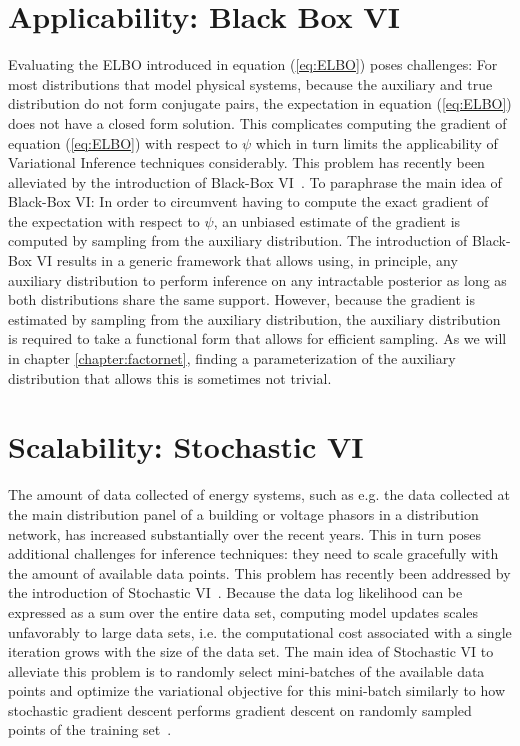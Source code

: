 \documentclass[11pt]{cmuthesis} %
\begin{document}
\section{Applicability: Black Box VI}
Evaluating the ELBO introduced in equation (\ref{eq:ELBO}) poses challenges: For most distributions that model physical systems, because the auxiliary and true distribution do not form conjugate pairs, the expectation in equation (\ref{eq:ELBO}) does not have a closed form solution. This complicates computing the gradient of equation (\ref{eq:ELBO}) with respect to $\psi$ which in turn limits the applicability of Variational Inference techniques considerably. This problem has recently been alleviated by the introduction of Black-Box VI~\cite{ranganath2014black}. To paraphrase the main idea of Black-Box VI: In order to circumvent having to compute the exact gradient of the expectation with respect to $\psi$, an unbiased estimate of the gradient is computed by sampling from the auxiliary distribution. The introduction of Black-Box VI results in a generic framework that allows using, in principle, any auxiliary distribution to perform inference on any intractable posterior as long as both distributions share the same support. However, because the gradient is estimated by sampling from the auxiliary distribution, the auxiliary distribution is required to take a functional form that allows for efficient sampling. As we will in chapter \ref{chapter:factornet}, finding a parameterization of the auxiliary distribution that allows this is sometimes not trivial.
\section{Scalability: Stochastic VI}
The amount of data collected of energy systems, such as e.g. the data collected at the main distribution panel of a building or voltage phasors in a distribution network, has increased substantially over the recent years. This in turn poses additional challenges for inference techniques: they need to scale gracefully with the amount of available data points. This problem has recently been addressed by the introduction of Stochastic VI~\cite{mesbah2017stochastic}. Because the data log likelihood can be expressed as a sum over the entire data set, computing model updates scales unfavorably to large data sets, i.e. the computational cost associated with a single iteration grows with the size of the data set. The main idea of Stochastic VI to alleviate this problem is to randomly select mini-batches of the available data points and optimize the variational objective for this mini-batch similarly to how stochastic gradient descent performs gradient descent on randomly sampled points of the training set~\cite{zinkevich2010parallelized,bottou2010large}.
\end{document}
